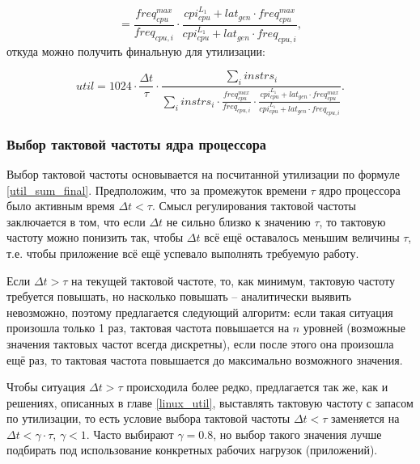     \begin{equation*}
        = \frac{freq_{cpu}^{max}}{freq_{cpu, i}} \cdot \frac{cpi_{cpu}^{L_1} + lat_{gen} \cdot freq_{cpu}^{max}}
            {cpi_{cpu}^{L_1} + lat_{gen} \cdot freq_{cpu, i}},
    \end{equation*}
    откуда можно получить финальную для утилизации:

    \begin{equation} \label{util_sum_final}
        util = 1024 \cdot \frac{\Delta t}{\tau} \cdot \frac{\sum \limits_i instrs_i}
            {\sum \limits_i instrs_i \cdot \frac{freq_{cpu}^{max}}{freq_{cpu, i}} \cdot
            \frac{cpi_{cpu}^{L_1} + lat_{gen} \cdot freq_{cpu}^{max}}{cpi_{cpu}^{L_1} + lat_{gen} \cdot freq_{cpu, i}}}.
    \end{equation}

\subsubsection{Выбор тактовой частоты ядра процессора}

    Выбор тактовой частоты основывается на посчитанной утилизации по формуле \eqref{util_sum_final}.
    Предположим, что за промежуток времени $\tau$ ядро процессора было активным время $\Delta t < \tau$.
    Смысл регулирования тактовой частоты заключается в том, что если $\Delta t$ не сильно близко к
    значению $\tau$, то тактовую частоту можно понизить так, чтобы $\Delta t$ всё ещё оставалось меньшим
    величины $\tau$, т.е. чтобы приложение всё ещё успевало выполнять требуемую работу.

    Если $\Delta t > \tau$ на текущей тактовой частоте, то, как минимум, тактовую частоту требуется повышать,
    но насколько повышать -- аналитически выявить невозможно, поэтому предлагается следующий алгоритм:
    если такая ситуация произошла только 1 раз, тактовая частота повышается на $n$ уровней (возможные
    значения тактовых частот всегда дискретны), если после этого она произошла ещё раз, то тактовая частота
    повышается до максимально возможного значения.

    Чтобы ситуация $\Delta t > \tau$ происходила более редко, предлагается так же, как и решениях,
    описанных в главе \ref{linux_util}, выставлять тактовую частоту с запасом по утилизации, то есть
    условие выбора тактовой частоты $\Delta t < \tau$ заменяется на $\Delta t < \gamma \cdot \tau$,
    $\gamma < 1$. Часто выбирают $\gamma = 0.8$, но выбор такого значения лучше подбирать под использование
    конкретных рабочих нагрузок (приложений).

